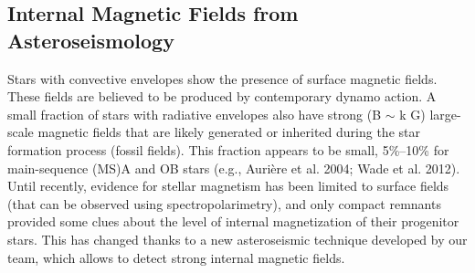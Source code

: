 {\color{red}\subsection{Internal Magnetic Fields from Asteroseismology}}
Stars with convective envelopes show the presence of
surface magnetic fields. These fields are believed to be produced by contemporary dynamo action.
A small fraction of stars with radiative envelopes also have strong (B $\sim$ k G)
large-scale magnetic fields that are likely generated or inherited during the star
formation process (fossil fields). This fraction appears to be small, 5\%–10\% for main-sequence (MS)A and OB stars (e.g., Aurière et al. 2004; Wade et al. 2012).
Until recently, evidence for stellar magnetism has been limited to surface fields (that can be observed using spectropolarimetry),
and only compact remnants provided some clues about the level of internal magnetization of their progenitor stars.
This has changed thanks to a new asteroseismic technique developed by our team, which allows to detect strong internal magnetic fields.